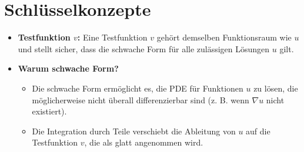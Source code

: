 \section{Schlüsselkonzepte}
\begin{itemize}
	\item \textbf{Testfunktion $v$:} Eine Testfunktion $v$ gehört demselben Funktionsraum wie $u$ und stellt sicher, dass die schwache Form für alle zulässigen Lösungen $u$ gilt.
	\item \textbf{Warum schwache Form?}
	\begin{itemize}
		\item Die schwache Form ermöglicht es, die PDE für Funktionen $u$ zu lösen, die möglicherweise nicht überall differenzierbar sind (z. B. wenn $\nabla u$ nicht existiert).
		\item Die Integration durch Teile verschiebt die Ableitung von $u$ auf die Testfunktion $v$, die als glatt angenommen wird.
	\end{itemize}
\end{itemize}

